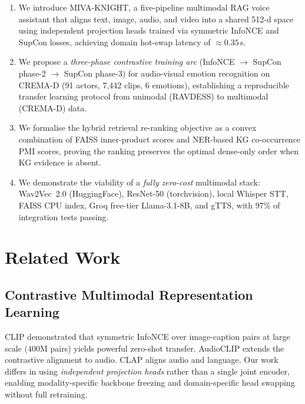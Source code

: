 \documentclass[10pt,conference]{IEEEtran}
\theoremstyle{ieeethm}
\theoremstyle{ieeedef}
\theoremstyle{ieeeremark}
\begin{document}
\begin{enumerate}
  \item We introduce \textsc{MIVA-KNIGHT}, a five-pipeline multimodal RAG voice assistant that aligns text, image, audio, and video into a shared 512-d space using independent projection heads trained via symmetric InfoNCE and SupCon losses, achieving domain hot-swap latency of $\approx 0.35$\,s.

  \item We propose a \emph{three-phase contrastive training arc} (InfoNCE $\rightarrow$ SupCon phase-2 $\rightarrow$ SupCon phase-3) for audio-visual emotion recognition on CREMA-D (91 actors, 7,442 clips, 6 emotions), establishing a reproducible transfer learning protocol from unimodal (RAVDESS) to multimodal (CREMA-D) data.

  \item We formalise the hybrid retrieval re-ranking objective as a convex combination of FAISS inner-product scores and NER-based KG co-occurrence PMI scores, proving the ranking preserves the optimal dense-only order when KG evidence is absent.

  \item We demonstrate the viability of a \emph{fully zero-cost} multimodal stack: Wav2Vec~2.0 (HuggingFace), ResNet-50 (torchvision), local Whisper STT, FAISS CPU index, Groq free-tier Llama-3.1-8B, and gTTS, with 97\% of integration tests passing.
\end{enumerate}

\section{Related Work}
\label{sec:related}

\subsection{Contrastive Multimodal Representation Learning}
CLIP \cite{radford2021learning} demonstrated that symmetric InfoNCE over image-caption pairs at large scale ($400$M pairs) yields powerful zero-shot transfer. AudioCLIP \cite{guzhov2022audioclip} extends the contrastive alignment to audio. CLAP \cite{elizalde2023clap} aligns audio and language. Our work differs in using \emph{independent projection heads} rather than a single joint encoder, enabling modality-specific backbone freezing and domain-specific head swapping without full retraining.
\end{document}
